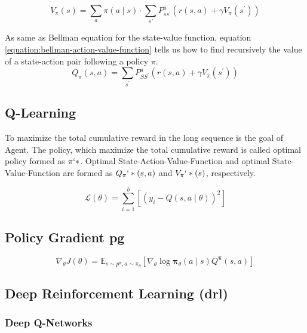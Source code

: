 \begin{equation} \label{equation:bellman-state-value-function}
V_{\pi}(s)=\sum_{a} \pi(a \mid s) \cdot \sum_{s \prime} P_{s s^{\prime}}^{a}\left(r(s, a)+\gamma V_{\pi}\left(s^{\prime}\right)\right)
\end{equation}

As same as Bellman equation for the state-value function, equation \ref{equation:bellman-action-value-function} tells us how to find recursively the value of a state-action pair following a policy $\pi$.
\begin{equation} \label{equation:bellman-action-value-function}
Q_{\pi}(s, a)=\sum_{s^{\prime}} P_{S S^{\prime}}^{a}\left(r(s, a)+\gamma V_{\pi}\left(s^{\prime}\right)\right)
\end{equation}

\subsection{Q-Learning}
To maximize the total cumulative reward in the long sequence is the goal of Agent. The policy, which maximize the total cumulative reward is called optimal policy formed as $\pi`*$. Optimal State-Action-Value-Function and optimal State-Value-Function are formed as $Q_\pi`*(s, a)$ and $V_\pi`*(s)$, respectively.

\begin{equation}
\mathcal{L}(\theta)=\sum_{i=1}^{b}\left[\left(y_{i}-Q(s, a \mid \theta)\right)^{2}\right]
\end{equation}
\subsection{Policy Gradient \gls{pg}}
\begin{equation}
\nabla_{\theta} J(\theta)=\mathbb{E}_{s \sim p^{\pi}, a \sim \pi_{\theta}}\left[\nabla_{\theta} \log \boldsymbol{\pi}_{\theta}(a \mid s) Q^{\boldsymbol{\pi}}(s, a)\right]
\end{equation}

\subsection{Deep Reinforcement Learning (\gls{drl})}
\subsubsection{Deep Q-Networks}

